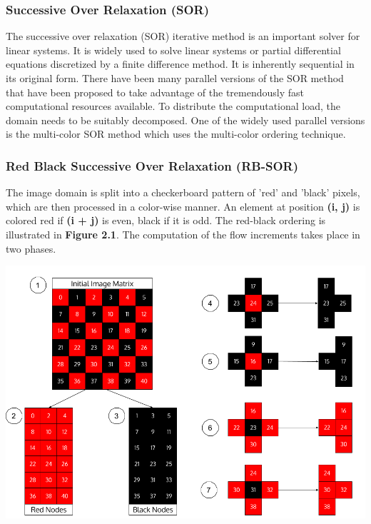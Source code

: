 \documentclass[english]{article}
\begin{document}
	\subsubsection{Successive Over Relaxation (SOR)}
	The successive over relaxation (SOR) iterative method \cite{10} is an important solver for linear systems. It is widely used to solve linear systems or partial differential equations discretized by a finite difference method. It is inherently sequential in its original form. There have been many parallel versions of the SOR method that have been proposed to take advantage of the tremendously fast computational resources available. To distribute the computational load, the domain needs to be suitably decomposed. One of the widely used parallel versions is the multi-color SOR method which uses the multi-color ordering technique.

	\subsubsection{Red Black Successive Over Relaxation (RB-SOR)}
	The image domain is split into a checkerboard pattern of 'red' and 'black' pixels, which are then processed in a color-wise manner. An element at position \textbf{(i, j)} is colored red if \textbf{(i + j)} is even, black if it is odd. The red-black ordering is illustrated in \textbf{Figure 2.1}. The computation of the flow increments takes place in two phases. \newline

	\begin{center}
	\includegraphics[width=175mm]{results/images/5-rb_order.png}
	\end{center}	
	
\end{document}
